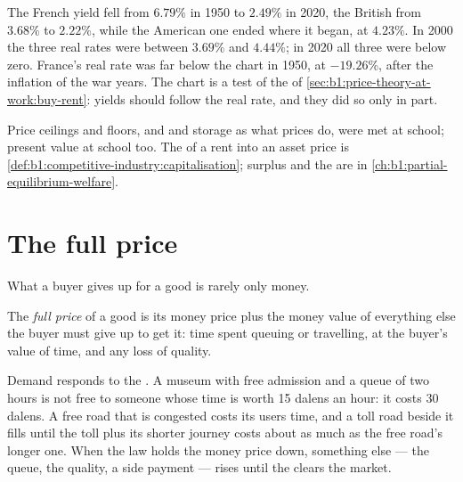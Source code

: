 The French yield fell from $6.79\%$ in 1950 to $2.49\%$ in 2020, the British
from $3.68\%$ to $2.22\%$, while the American one ended where it began, at
$4.23\%$. In 2000 the three real rates were between $3.69\%$ and $4.44\%$; in 2020
all three were below zero. %
France's real rate was far below the chart in 1950, at $-19.26\%$, after the
inflation of the war years. %
The chart is a test of the  of \cref{sec:b1:price-theory-at-work:buy-rent}:
yields should follow the real rate, and they did so only in part.

\begin{recall}
Price ceilings and floors, and  and storage as what prices do,
were met at school; present value at school too. The  of a
rent into an asset price is \cref{def:b1:competitive-industry:capitalisation};
surplus and the  are in \cref{ch:b1:partial-equilibrium-welfare}.
\end{recall}

\section{The full price}\label{sec:b1:price-theory-at-work:full-price}

What a buyer gives up for a good is rarely only money.

\begin{definition}\label{def:b1:price-theory-at-work:full-price}
The \emph{full price} of a good is its money price plus the money value of
everything else the buyer must give up to get it: time spent queuing or
travelling, at the buyer's value of time, and any loss of quality.
\end{definition}

Demand responds to the . A museum with free admission and a queue of
two hours is not free to someone whose time is worth 15 dalens an hour: it
costs 30 dalens. A free road that is congested costs its users time, and a
toll road beside it fills until the toll plus its shorter journey costs
about as much as the free road's longer one. When the law holds the money
price down, something else --- the queue, the quality, a side payment ---
rises until the  clears the market.

